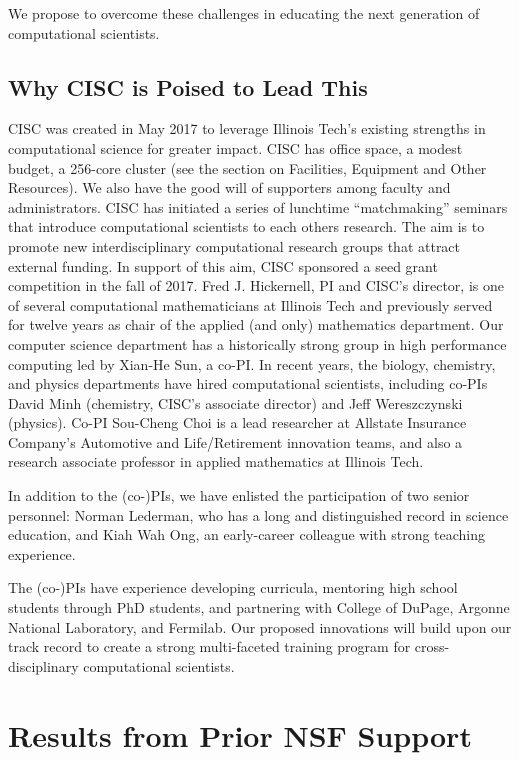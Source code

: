 \documentclass[11pt]{NSFamsart}
\begin{document}
We propose to overcome these challenges in educating the next generation of computational scientists.

\subsection*{Why CISC is Poised to Lead This}
CISC was created in May 2017 to leverage Illinois Tech's existing strengths in computational science for greater impact.  CISC has office space, a modest budget, a 256-core cluster (see the section on Facilities, Equipment and Other Resources).  We also have the good will of supporters among faculty and administrators.  CISC has initiated a series of lunchtime ``matchmaking'' seminars that introduce computational scientists to each others research.  The aim is to promote new interdisciplinary computational research groups that attract external funding. In support of this aim, CISC sponsored a seed grant competition in the fall of 2017. Fred J. Hickernell, PI and CISC’s director, is one of several computational mathematicians at Illinois Tech and previously served for twelve years as chair of the applied (and only) mathematics department.  Our computer science department has a historically strong group in high performance computing led by Xian-He Sun, a co-PI.  In recent years, the biology, chemistry, and physics departments have hired computational scientists, including co-PIs David Minh (chemistry, CISC's associate director) and Jeff Wereszczynski (physics).  Co-PI Sou-Cheng Choi is a lead researcher at Allstate Insurance Company's Automotive and Life/Retirement innovation teams, and also a research associate professor in applied mathematics at Illinois Tech.

In addition to the (co-)PIs, we have enlisted the participation of two senior personnel:  Norman Lederman, who has a long and distinguished record in science education, and Kiah Wah Ong, an early-career colleague with strong teaching experience.

The (co-)PIs have experience developing curricula, mentoring high school students through PhD students, and partnering with College of DuPage, Argonne National Laboratory, and Fermilab.  Our proposed innovations will build upon our track record to create a strong multi-faceted training program for cross-disciplinary computational scientists.

\section{Results from Prior NSF Support}
\end{document}
